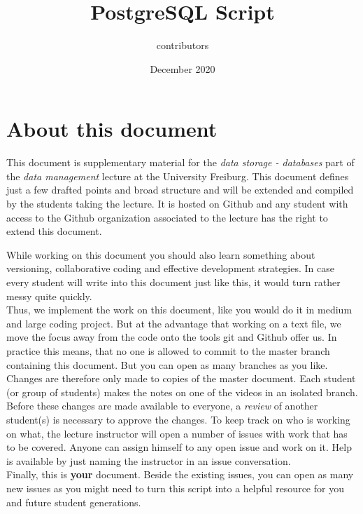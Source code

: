 \documentclass{article}
\title{PostgreSQL Script}
\author{contributors}
\date{December 2020}
\begin{document}
\maketitle

\section{About this document}

This document is supplementary material for the \textit{data storage - databases} part of the \textit{data management} lecture at the University Freiburg. 
This document defines just a few drafted points and broad structure and will be extended and compiled by the students taking the lecture. It is hosted on Github and any student with access to the Github organization associated to the lecture has the right to extend this document.

While working on this document you should also learn something about versioning, collaborative coding and effective development strategies. 
In case every student will write into this document just like this, it would turn rather messy quite quickly.\\
Thus, we implement the work on this document, like you would do it in medium and large coding project. 
But at the advantage that working on a text file, we move the focus away from the code onto the tools git and Github offer us. In practice this means, that no one is allowed to commit to the master branch containing this document. 
But you can open as many branches as you like. Changes are therefore only made to copies of the master document. Each student (or group of students) makes the notes on one of the videos in an isolated branch. 
Before these changes are made available to everyone, a \textit{review} of another student(s) is necessary to approve the changes. 
To keep track on who is working on what, the lecture instructor will open a number of issues with work that has to be covered. Anyone can assign himself to any open issue and work on it. Help is available by just naming the instructor in an issue conversation.\\
Finally, this is \textbf{your} document. Beside the existing issues, you can open as many new issues as you might need to turn this script into a helpful resource for you and future student generations.







\end{document}
